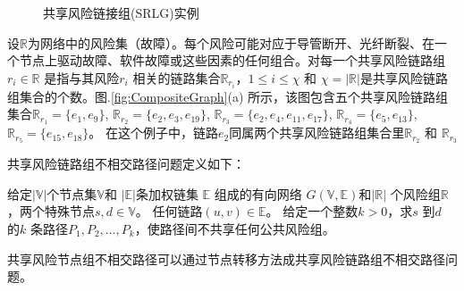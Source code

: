 \begin{figure}[htbp]
\centering
{}
\caption{共享风险链接组(SRLG)实例}\label{fig:SRLGgraph}
\label{fig:Logic shift operation}
\end{figure}

设$\mathbb{R}$为网络中的风险集（故障）。每个风险可能对应于导管断开、光纤断裂、在一个节点上驱动故障、软件故障或这些因素的任何组合。对每一个共享风险链路组$r_i \in \mathbb{R}$ 是指与其风险$r_i$ 相关的链路集合$\mathbb{R}_{r_i}$，$1\leq i\leq \chi$ 和 $\chi=|{\mathbb{R}}|$是共享风险链路组集合的个数。图.\ref{fig:CompositeGraph}(a) 所示，该图包含五个共享风险链路组集合$\mathbb{R}_{r_1}=\{e_1,e_9\}$, $\mathbb{R}_{r_2}=\{e_2,e_3,e_{19}\}$, $\mathbb{R}_{r_3}=\{e_2,e_4,e_{11},e_{17}\}$, $\mathbb{R}_{r_4}=\{e_5,e_{13}\}$, $\mathbb{R}_{r_5}=\{e_{15},e_{18}\}$。 在这个例子中，链路$e_2$同属两个共享风险链路组集合里$\mathbb{R}_{r_2}$ 和 $\mathbb{R}_{r_3}$





共享风险链路组不相交路径问题定义如下：

\begin{definition}[共享风险链路组不相交路径问题]
给定$|\mathbb{V}|$个节点集$\mathbb{V}$和 $|\mathbb{E}|$条加权链集 $\mathbb{E}$ 组成的有向网络 $G(\mathbb{V},\mathbb{E})$和$|\mathbb{R}|$ 个风险组$\mathbb{R}$，两个特殊节点$s,d\in\mathbb{V}$。 任何链路$(u,v)\in\mathbb{E}$。 给定一个整数$k>0$，求$s$ 到$d$ 的$k$ 条路径$P_1,P_2,\ldots,P_k$，使路径间不共享任何公共风险组。
\end{definition}

共享风险节点组不相交路径可以通过节点转移方法成共享风险链路组不相交路径问题。

